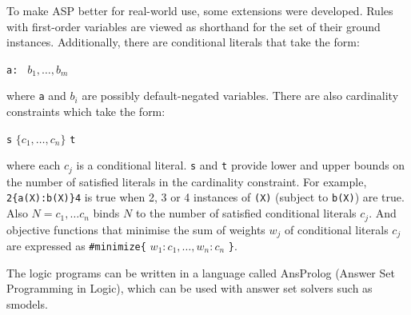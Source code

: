 To make ASP better for real-world use, some extensions were developed.
Rules with first-order variables are viewed as shorthand for the set of their
ground instances.
Additionally, there are conditional literals that take the form:
\begin{center}
	\verb|a: | \( b_1, \ldots, b_m \)
\end{center}
where \verb|a| and \( b_i \) are possibly default-negated variables.
There are also cardinality constraints which take the form:
\begin{center}
	\verb|s| \( \{c_1, \ldots, c_n\} \) \verb|t|
\end{center}
where each \( c_j \) is a conditional literal.
\verb|s| and \verb|t| provide lower and upper bounds on the number of satisfied
literals in the cardinality constraint.
For example, \verb|2{a(X):b(X)}4| is true when 2, 3 or 4 instances of \verb|(X)|
(subject to \verb|b(X)|) are true. 
Also \( N=c_1,\ldots c_n \) binds \( N \) to the number of satisfied conditional
literals \( c_j \).
And objective functions that minimise the sum of weights \( w_j \) of
conditional literals \( c_j \) are expressed as \verb|#minimize{| \( w_1:c_1,
\ldots, w_n:c_n \) \verb|}|.

The logic programs can be written in a language called AnsProlog (Answer Set
Programming in Logic), which can be used with answer set solvers such as
smodels.

